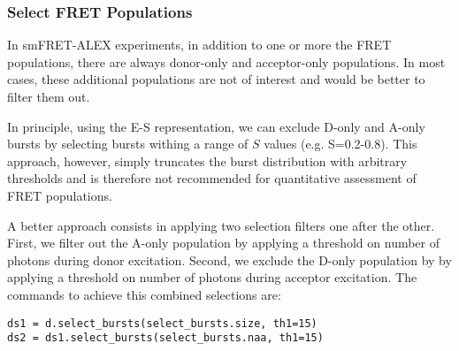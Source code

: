 \subsubsection{Select FRET Populations}

In smFRET-ALEX experiments, in addition to one or more the FRET populations, there are always
donor-only and acceptor-only populations. In most cases, these additional populations
are not of interest and would be better to filter them out.

In principle, using the E-S representation, we can exclude D-only and A-only bursts
by selecting bursts withing a range of $S$ values (e.g. S=0.2-0.8). 
This approach, however, simply truncates the burst distribution with arbitrary 
thresholds and is therefore not recommended for quantitative assessment of FRET 
populations.

A better approach consists in applying two selection filters one after the other.
First, we filter out the A-only population 
by applying a threshold on number of photons during donor excitation.
Second, we exclude the D-only population by
by applying a threshold on number of photons during acceptor excitation.
The commands to achieve this combined selections are:

\begin{verbatim}
ds1 = d.select_bursts(select_bursts.size, th1=15)
ds2 = ds1.select_bursts(select_bursts.naa, th1=15)
\end{verbatim}

